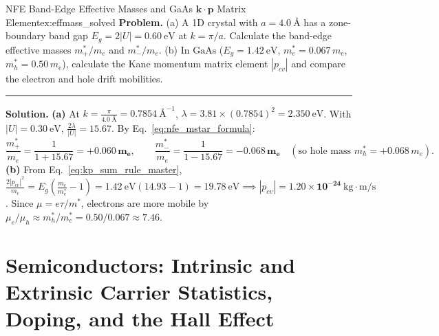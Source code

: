 \documentclass[11pt,a4paper]{article}
\newcommand{\abs}[1]{\left|#1\right|}
\newcommand{\vb}[1]{\mathbf{#1}}
\newcommand{\kk}{\mathbf{k}}
\begin{document}
\begin{examplebox}{NFE Band-Edge Effective Masses and GaAs $\kk\cdot\vb{p}$ Matrix Element}{ex:effmass_solved}
\textbf{Problem.} (a) A 1D crystal with $a = 4.0\ \text{\AA}$ has a zone-boundary band gap $E_g = 2\abs{U} = 0.60\ \mathrm{eV}$ at $k = \pi/a$. Calculate the band-edge effective masses $m_+^*/m_e$ and $m_-^*/m_e$. (b) In $\text{GaAs}$ ($E_g = 1.42\ \mathrm{eV}$, $m_e^* = 0.067\,m_e$, $m_h^* = 0.50\,m_e$), calculate the Kane momentum matrix element $\abs{p_{cv}}$ and compare the electron and hole drift mobilities.
\vspace{0.2cm}\hrule\vspace{0.2cm}
\textbf{Solution.}
\textbf{(a)} At $k = \frac{\pi}{4.0\ \text{\AA}} = 0.7854\ \text{\AA}^{-1}$, $\lambda = 3.81 \times (0.7854)^2 = 2.350\ \mathrm{eV}$. With $\abs{U} = 0.30\ \mathrm{eV}$, $\frac{2\lambda}{\abs{U}} = 15.67$. By Eq.~\eqref{eq:nfe_mstar_formula}:
\[
    \frac{m_+^*}{m_e} = \frac{1}{1 + 15.67} = \mathbf{+0.060\,m_e}, \qquad \frac{m_-^*}{m_e} = \frac{1}{1 - 15.67} = \mathbf{-0.068\,m_e} \quad (\text{so hole mass } m_h^* = +0.068\,m_e).
\]
\textbf{(b)} From Eq.~\eqref{eq:kp_sum_rule_master}, $\frac{2\abs{p_{cv}}^2}{m_e} = E_g\left(\frac{m_e}{m_e^*} - 1\right) = 1.42\ \mathrm{eV}(14.93 - 1) = 19.78\ \mathrm{eV} \implies \abs{p_{cv}} = \mathbf{1.20 \times 10^{-24}\ \mathrm{kg\cdot m/s}}$. Since $\mu = e\tau/m^*$, electrons are more mobile by $\mu_e/\mu_h \approx m_h^*/m_e^* = 0.50/0.067 \approx \mathbf{7.46}$.
\end{examplebox}

\section{Semiconductors: Intrinsic and Extrinsic Carrier Statistics, Doping, and the Hall Effect}
\label{sec:semiconductors}
\end{document}

